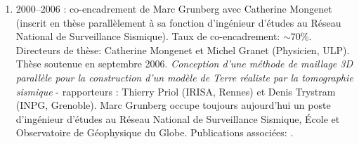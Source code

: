 \begin{enumerate}
\item 2000--2006 : co-encadrement de Marc Grunberg avec Catherine Mongenet 
(inscrit en thèse parallèlement à sa fonction d'ingénieur d'études au Réseau 
National de Surveillance Sismique). Taux de co-encadrement: $\sim$70\%.
Directeurs de thèse: Catherine Mongenet et Michel Granet (Physicien, ULP).
Thèse soutenue en septembre 2006. \textit{Conception 
d'une méthode de maillage 3D parallèle pour la construction d'un modèle de Terre 
réaliste par la tomographie sismique} - rapporteurs : Thierry Priol (IRISA, Rennes) 
et Denis Trystram (INPG, Grenoble).
Marc Grunberg occupe toujours aujourd'hui un poste d'ingénieur d'études au Réseau 
National de Surveillance Sismique, \'{E}cole et Observatoire de Géophysique du Globe.
Publications associées: 
\cite{icps-2002-20,icps-2003-111,icps-2003-113,
      icps-2004-107,icps-2004-124,icps-2005-146,icps-2007-184}.\\



\end{enumerate}
